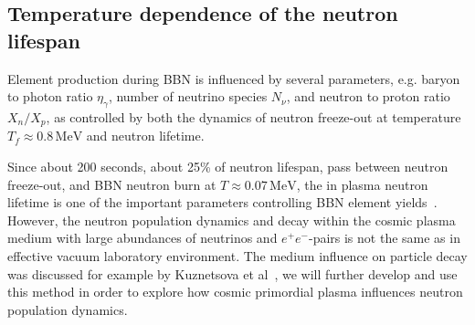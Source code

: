 \subsection{Temperature dependence of the neutron lifespan}\label{sec:neutron}
Element production during BBN is influenced by several parameters, e.g. baryon to photon ratio $\eta_\gamma$, number of neutrino species $N_\nu$, and neutron to proton ratio $X_n/X_p$, as controlled by both the dynamics of neutron freeze-out at temperature $T_f\approx 0.8\,\mathrm{MeV}$ and neutron lifetime.

Since about 200 seconds, about 25\% of neutron lifespan, pass between neutron freeze-out, and BBN neutron burn at $T\approx0.07\,\mathrm{MeV}$, the in plasma neutron lifetime is one of the important parameters controlling BBN element yields~\cite{Pitrou:2018cgg}. However, the neutron population dynamics and decay within the cosmic plasma medium with large abundances of neutrinos and $e^+e^-$-pairs is not the same as in effective vacuum laboratory environment. The medium influence on particle decay was discussed for example by Kuznetsova et al~\cite{Kuznetsova:2010pi}, we will further develop and use this method in order to explore how cosmic primordial plasma influences neutron population dynamics.
 
